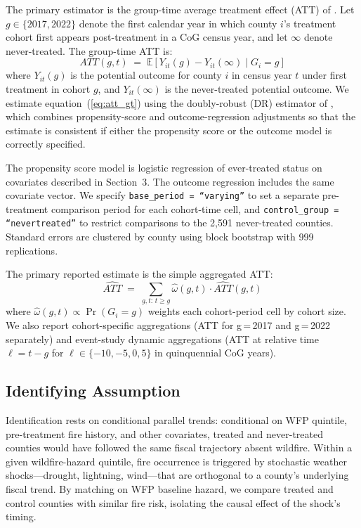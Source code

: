 \documentclass[12pt]{article}
\begin{document}
The primary estimator is the group-time average treatment effect (ATT) of
\citet{callaway2021}. Let $g \in \{2017, 2022\}$ denote the first calendar year
in which county $i$'s treatment cohort first appears post-treatment in a CoG
census year, and let $\infty$ denote never-treated. The group-time ATT is:
%
\begin{equation}
  ATT(g, t) \;=\; \mathbb{E}\!\left[Y_{it}(g) - Y_{it}(\infty) \mid G_i = g\right]
  \label{eq:att_gt}
\end{equation}
%
\noindent where $Y_{it}(g)$ is the potential outcome for county $i$ in census year
$t$ under first treatment in cohort $g$, and $Y_{it}(\infty)$ is the never-treated
potential outcome. We estimate equation~(\ref{eq:att_gt}) using the doubly-robust
(DR) estimator of \citet{callaway2021}, which combines propensity-score and
outcome-regression adjustments so that the estimate is consistent if either
the propensity score or the outcome model is correctly specified.

The propensity score model is logistic regression of ever-treated status on
covariates described in Section~3. The outcome regression includes the same covariate
vector. We specify \texttt{base\_period = ``varying''} to set a separate
pre-treatment comparison period for each cohort-time cell, and
\texttt{control\_group = ``nevertreated''} to restrict comparisons to the 2,591
never-treated counties. Standard errors are clustered by county using block bootstrap
with 999 replications.

The primary reported estimate is the simple aggregated ATT:
%
\begin{equation}
  \widehat{ATT} \;=\; \sum_{g,t:\,t \geq g} \hat{\omega}(g,t) \cdot \widehat{ATT}(g,t)
  \label{eq:att_simple}
\end{equation}
%
\noindent where $\hat{\omega}(g,t) \propto \Pr(G_i = g)$ weights each cohort-period
cell by cohort size. We also report cohort-specific aggregations (ATT for
g\,=\,2017 and g\,=\,2022 separately) and event-study dynamic aggregations
(ATT at relative time $\ell = t - g$ for $\ell \in \{-10, -5, 0, 5\}$ in
quinquennial CoG years).

\subsection{Identifying Assumption}
\label{sec:identify}

Identification rests on conditional parallel trends: conditional on WFP quintile,
pre-treatment fire history, and other covariates, treated and never-treated counties
would have followed the same fiscal trajectory absent wildfire. Within a given
wildfire-hazard quintile, fire occurrence is triggered by stochastic weather
shocks---drought, lightning, wind---that are orthogonal to a county's underlying
fiscal trend. By matching on WFP baseline hazard, we compare treated and control
counties with similar fire risk, isolating the causal effect of the shock's timing.
\end{document}
